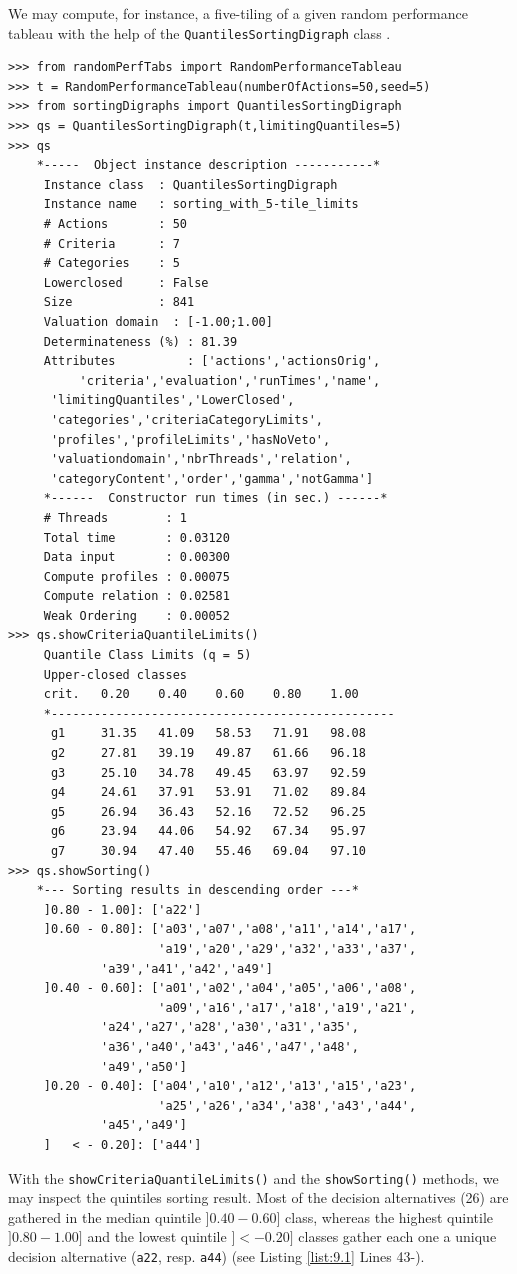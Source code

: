 We may compute, for instance, a five-tiling of a given random performance tableau with the help of the \texttt{QuantilesSortingDigraph} class .
\begin{lstlisting}[caption={Computing a quintiles sorting result},label=list:9.1]
>>> from randomPerfTabs import RandomPerformanceTableau
>>> t = RandomPerformanceTableau(numberOfActions=50,seed=5)
>>> from sortingDigraphs import QuantilesSortingDigraph
>>> qs = QuantilesSortingDigraph(t,limitingQuantiles=5)
>>> qs
    *-----  Object instance description -----------*
     Instance class  : QuantilesSortingDigraph
     Instance name   : sorting_with_5-tile_limits
     # Actions       : 50
     # Criteria      : 7
     # Categories    : 5
     Lowerclosed     : False
     Size            : 841
     Valuation domain  : [-1.00;1.00]
     Determinateness (%) : 81.39
     Attributes          : ['actions','actionsOrig',
          'criteria','evaluation','runTimes','name',
	  'limitingQuantiles','LowerClosed',
	  'categories','criteriaCategoryLimits',
	  'profiles','profileLimits','hasNoVeto',
	  'valuationdomain','nbrThreads','relation',
	  'categoryContent','order','gamma','notGamma']
     *------  Constructor run times (in sec.) ------*
     # Threads        : 1
     Total time       : 0.03120
     Data input       : 0.00300
     Compute profiles : 0.00075
     Compute relation : 0.02581
     Weak Ordering    : 0.00052
>>> qs.showCriteriaQuantileLimits()
     Quantile Class Limits (q = 5)
     Upper-closed classes
     crit.	 0.20	 0.40	 0.60	 0.80	 1.00	 
     *------------------------------------------------
      g1	 31.35	 41.09	 58.53	 71.91	 98.08	 
      g2	 27.81	 39.19	 49.87	 61.66	 96.18	 
      g3	 25.10	 34.78	 49.45	 63.97	 92.59	 
      g4	 24.61	 37.91	 53.91	 71.02	 89.84	 
      g5	 26.94	 36.43	 52.16	 72.52	 96.25	 
      g6	 23.94	 44.06	 54.92	 67.34	 95.97	 
      g7	 30.94	 47.40	 55.46	 69.04	 97.10	 
>>> qs.showSorting()
    *--- Sorting results in descending order ---*
     ]0.80 - 1.00]: ['a22']
     ]0.60 - 0.80]: ['a03','a07','a08','a11','a14','a17',
                     'a19','a20','a29','a32','a33','a37',
		     'a39','a41','a42','a49']
     ]0.40 - 0.60]: ['a01','a02','a04','a05','a06','a08',
                     'a09','a16','a17','a18','a19','a21',
		     'a24','a27','a28','a30','a31','a35',
		     'a36','a40','a43','a46','a47','a48',
		     'a49','a50']
     ]0.20 - 0.40]: ['a04','a10','a12','a13','a15','a23',
                     'a25','a26','a34','a38','a43','a44',
		     'a45','a49']
     ]   < - 0.20]: ['a44']
   \end{lstlisting}
With the \texttt{showCriteriaQuantileLimits()} and the \texttt{showSorting()} methods, we may inspect the quintiles sorting result. Most of the decision alternatives (26) are gathered in the median quintile $]0.40 - 0.60]$ class, whereas the highest quintile $]0.80-1.00]$ and the lowest quintile $]< - 0.20]$ classes gather each one a unique decision alternative (\texttt{a22}, resp. \texttt{a44}) (see Listing \ref{list:9.1} Lines 43-).

